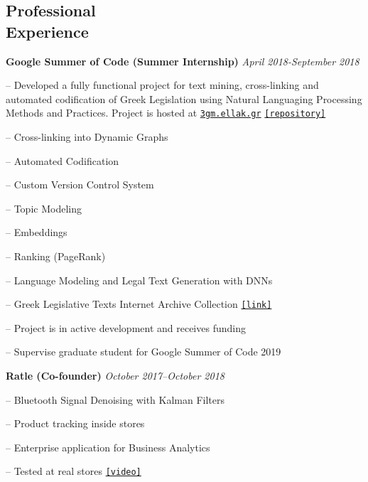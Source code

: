 \documentclass[margin, 10pt]{res}
\newcommand{\field}[2]{\noindent \textbf{#1} \hfill #2 \\}
\begin{document}
\begin{resume}
 

\section{Professional \\ Experience}
\field{Google Summer of Code (Summer Internship)}  {\emph{April 2018-September 2018}}
\begin{compactitem}
\item[--] Developed a fully functional project for text mining, cross-linking and automated codification of Greek Legislation using Natural Languaging Processing Methods and Practices. Project is hosted at \href{https://3gm.ellak.gr}{\nolinkurl{3gm.ellak.gr}} \href{https://github.com/eellak/gsoc2018-3gm}{\nolinkurl{[repository]}}
\begin{compactitem}
\item[--] Cross-linking into Dynamic Graphs
\item[--] Automated Codification
\item[--] Custom Version Control System
\item[--] Topic Modeling 
\item[--] Embeddings
\item[--] Ranking (PageRank)
\item[--] Language Modeling and Legal Text Generation with DNNs
\item[--] Greek Legislative Texts Internet Archive Collection \href{https://archive.org/details/greekgovernmentgazette}{\nolinkurl{[link]}}
\end{compactitem} 
\item[--] Project is in active development and receives funding
\item[--] Supervise graduate student for Google Summer of Code 2019 
\end{compactitem}

\field{Ratle (Co-founder)} {\emph{October 2017--October 2018}}
\begin{compactitem}
\item[--] Bluetooth Signal Denoising with Kalman Filters
\item[--] Product tracking inside stores
\item[--] Enterprise application for Business Analytics
\item[--] Tested at real stores \href{https://www.youtube.com/watch?v=XemEQaNxL3Q&feature=youtu.be}{\nolinkurl{[video]}}
\end{compactitem}



\end{resume}
\end{document}
